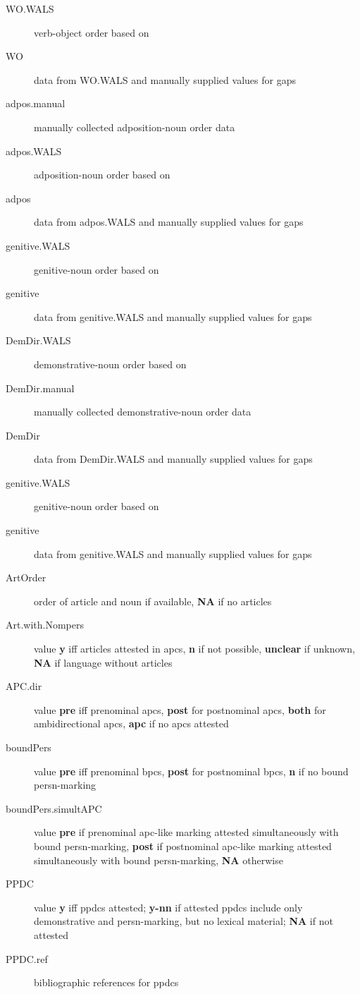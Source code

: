 \documentclass[A4paper]{article}
\begin{document}
\begin{description}
\item[WO.WALS] verb-object order based on \citet{wals-83}
\item[WO] data from WO.WALS and manually supplied values for gaps
\item[adpos.manual] manually collected adposition-noun order data
\item[adpos.WALS] adposition-noun order based on \citet{wals-85}
\item[adpos] data from adpos.WALS and manually supplied values for gaps
\item[genitive.WALS] genitive-noun order based on \citet{wals-86}
\item[genitive] data from genitive.WALS and manually supplied values for gaps
\item[DemDir.WALS] demonstrative-noun order based on \citet{wals-88}
\item[DemDir.manual] manually collected demonstrative-noun order data
\item[DemDir] data from DemDir.WALS and manually supplied values for gaps
\item[genitive.WALS] genitive-noun order based on \citet{wals-86}
\item[genitive] data from genitive.WALS and manually supplied values for gaps
\item[ArtOrder] order of article and noun if available, \textbf{NA} if no articles
\item[Art.with.Nompers] value \textbf{y} iff articles attested in \glspl{apc}, \textbf{n} if not possible, \textbf{unclear} if unknown, \textbf{NA} if language without articles
\item[APC.dir] value \textbf{pre} iff prenominal \glspl{apc}, \textbf{post} for postnominal \glspl{apc}, \textbf{both} for ambidirectional \glspl{apc}, \textbf{apc} if no \glspl{apc} attested
\item[boundPers] value \textbf{pre} iff prenominal \glspl{bpc}, \textbf{post} for postnominal \glspl{bpc}, \textbf{n} if no bound \gls{persn}-marking
\item[boundPers.simultAPC] value \textbf{pre} if prenominal \gls{apc}-like marking attested simultaneously with bound \gls{persn}-marking, \textbf{post} if postnominal \gls{apc}-like marking attested simultaneously with bound \gls{persn}-marking, \textbf{NA} otherwise
\item[PPDC] value \textbf{y} iff \glspl{ppdc} attested; \textbf{y-nn} if attested \glspl{ppdc} include only demonstrative and \gls{persn}-marking, but no lexical material; \textbf{NA} if not attested
\item[PPDC.ref] bibliographic references for \glspl{ppdc}
\end{description}
\end{document}
